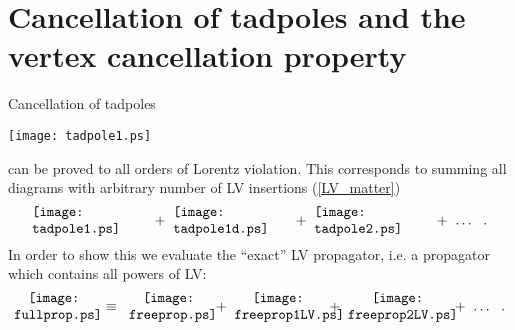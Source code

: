\documentclass[12pt]{revtex4}
\begin{document}
\section{Cancellation of tadpoles and 
 the vertex cancellation property}
\label{app_cancellation}

Cancellation of tadpoles 
\begin{center}
\texttt{[image: tadpole1.ps]}
\end{center}
can be proved to all orders of Lorentz violation.
This corresponds to summing all diagrams with arbitrary
number of LV insertions (\ref{LV_matter})
\begin{equation}
\label{full_tadpole}
\begin{minipage}[c]{3.0cm}
\texttt{[image: tadpole1.ps]} 
\end{minipage}
   +~
\begin{minipage}[c]{3.0cm}
\texttt{[image: tadpole1d.ps]} 
\end{minipage}
   +~
\begin{minipage}[c]{3.0cm}
\texttt{[image: tadpole2.ps]} 
\end{minipage}
   +~
   \ldots
   ~~.
\end{equation}
In order to show this we evaluate the ``exact'' LV 
propagator, i.e. a propagator which contains all powers
of LV:
\begin{equation}
\label{def_full_prop}
\begin{minipage}[c]{2.0cm}
\centering
\texttt{[image: fullprop.ps]} 
\end{minipage}
    \;~\equiv~\;
\begin{minipage}[c]{2.0cm}
\centering
\texttt{[image: freeprop.ps]} 
\end{minipage}
    ~+~
\begin{minipage}[c]{2.2cm}
\centering
\texttt{[image: freeprop1LV.ps]} 
\end{minipage}
    ~+~
\begin{minipage}[c]{2.5cm}
\centering
\texttt{[image: freeprop2LV.ps]} 
\end{minipage}
    ~+~
    \ldots
    ~~.
\end{equation}
\end{document}
